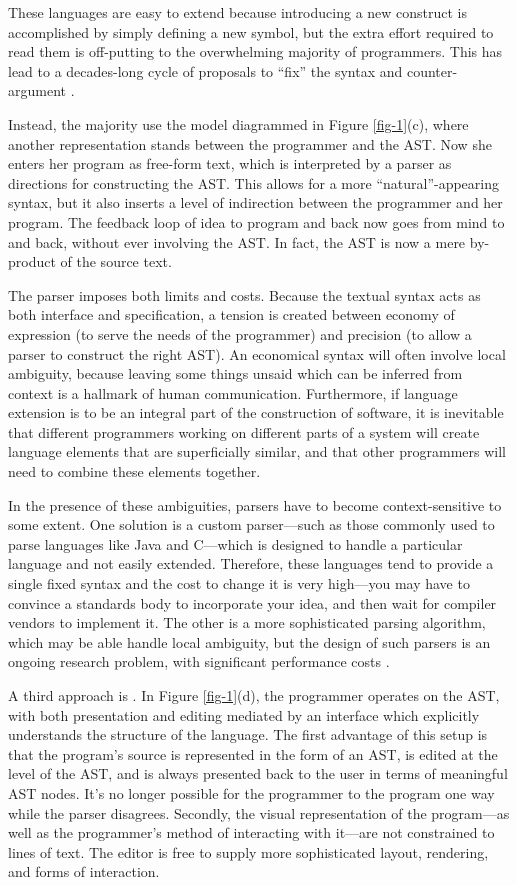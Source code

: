 These languages are easy to extend because introducing a new construct is accomplished by simply defining a new symbol, but the extra effort required to read them is off-putting to the overwhelming majority of programmers. This has lead to a decades-long cycle of proposals to ``fix'' the syntax and counter-argument \cite{lisp-hated}.

Instead, the majority use the model diagrammed in Figure \ref{fig-1}(c), where another representation stands between the programmer and the AST. Now she enters her program as free-form text, which is interpreted by a parser as directions for constructing the AST. This allows for a more ``natural''-appearing syntax, but it also inserts a level of indirection between the programmer and her program. The feedback loop of idea to program and back now goes from mind to  and back, without ever involving the AST. In fact, the AST is now a mere by-product of the source text. 

The parser imposes both limits and costs. Because the textual syntax acts as both interface and specification, a tension is created between economy of expression (to serve the needs of the programmer) and precision (to allow a parser to construct the right AST). An economical syntax will often involve local ambiguity, because leaving some things unsaid which can be inferred from context is a hallmark of human communication. Furthermore, if language extension is to be an integral part of the construction of software, it is inevitable that different programmers working on different parts of a system will create language elements that are superficially similar, and that other programmers will need to combine these elements together.

In the presence of these ambiguities, parsers have to become context-sensitive to some extent. One solution is a custom parser---such as those commonly used to parse languages like Java and C---which is designed to handle a particular language and not easily extended. Therefore, these languages tend to provide a single fixed syntax and the cost to change it is very high---you may have to convince a standards body to incorporate your idea, and then wait for compiler vendors to implement it. The other is a more sophisticated parsing algorithm, which may be able handle local ambiguity, but the design of such parsers is an ongoing research problem, with significant performance costs \cite{frost}. 

A third approach is . In Figure \ref{fig-1}(d), the programmer operates on the AST, with both presentation and editing mediated by an interface which explicitly understands the structure of the language. The first advantage of this setup is that the program's source is represented in the form of an AST, is edited at the level of the AST, and is always presented back to the user in terms of meaningful AST nodes. It's no longer possible for the programmer to  the program one way while the parser disagrees. Secondly, the visual representation of the program---as well as the programmer's method of interacting with it---are not constrained to lines of text. The editor is free to supply more sophisticated layout, rendering, and forms of interaction.

